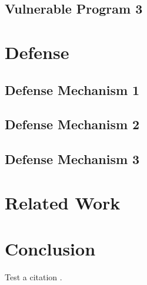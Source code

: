 \documentclass[letterpaper,10pt]{article} %
\begin{document}
\subsection{Vulnerable Program 3}

\section{Defense}

\subsection{Defense Mechanism 1}
\subsection{Defense Mechanism 2}
\subsection{Defense Mechanism 3}

\section{Related Work}

\section{Conclusion}

Test a citation \citep{Pappas2012SmashingGadgets}.



\end{document}

